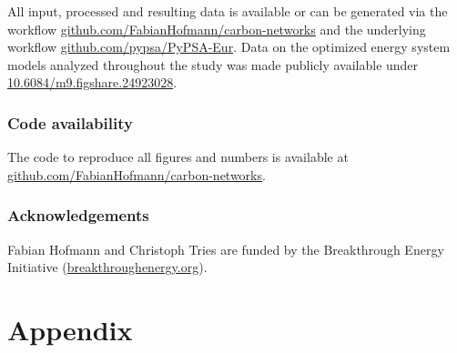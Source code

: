 \documentclass[twocolumn]{article}
\begin{document}
All input, processed and resulting data is available or can be generated via the workflow \href{https://github.com/FabianHofmann/carbon-networks}{github.com/FabianHofmann/carbon-networks} and the underlying workflow \href{https://github.com/PyPSA/pypsa-eur}{github.com/pypsa/PyPSA-Eur}. Data on the optimized energy system models analyzed throughout the study was made publicly available under \href{https://doi.org/10.6084/m9.figshare.24923028}{10.6084/m9.figshare.24923028}.

\subsubsection*{Code availability}

The code to reproduce all figures and numbers is available at \href{https://github.com/FabianHofmann/carbon-networks}{github.com/FabianHofmann/carbon-networks}.


\subsubsection*{Acknowledgements}

Fabian Hofmann and Christoph Tries are funded by the Breakthrough Energy Initiative (\href{https://breakthroughenergy.org/}{breakthroughenergy.org}).


\printbibliography

\newpage
\appendix
\setcounter{section}{0}
\renewcommand{\thesection}{\Alph{section}}
\renewcommand{\thefigure}{\Alph{section}.\arabic{figure}}

\onecolumn %

\section{Appendix}
\end{document}
